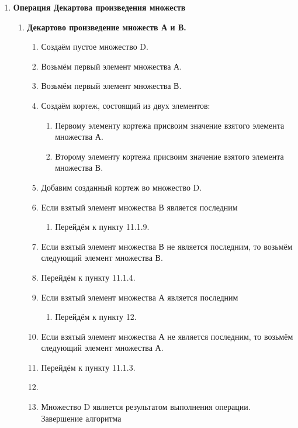 \documentclass[a4paper,12pt]{extarticle}
\begin{document}
\begin{enumerate}
\begin{enumerate}[label*=\arabic*.]
\begin{enumerate}[label*=\arabic*.]
\begin{enumerate}[label*=\arabic*.]
        \end{enumerate}
      \end{enumerate}
    \end{enumerate}
  \item \textbf{Операция Декартова произведения множеств}
  \begin{enumerate}[label*=\arabic*.]
    \item \textbf{Декартово произведение множеств А и В.}
    \begin{enumerate}[label*=\arabic*.]
      \item Создаём пустое множество D.
      \item Возьмём первый элемент множества А.
      \item Возьмём первый элемент множества В.
      \item Создаём кортеж, состоящий из двух элементов:
      \begin{enumerate}[label*=\arabic*.]
        \item Первому элементу кортежа присвоим значение взятого элемента множества А.
        \item Второму элементу кортежа присвоим значение взятого элемента множества В.
      \end{enumerate}
      \item Добавим созданный кортеж во множество D.
      \newpage
      \item Если взятый элемент множества В является последним
      \begin{enumerate}[label*=\arabic*.]
        \item Перейдём к пункту 11.1.9.
      \end{enumerate}
      \item Если взятый элемент множества В не является последним, то возьмём следующий элемент множества В.
      \item Перейдём к пункту 11.1.4.
      \item Если взятый элемент множества А является последним
      \begin{enumerate}[label*=\arabic*.]
        \item Перейдём к пункту 12.
      \end{enumerate}
      \item Если взятый элемент множества А не является последним, то возьмём следующий элемент множества А.
      \item Перейдём к пункту 11.1.3.
      \item \item Множество D является результатом выполнения операции. Завершение алгоритма

\end{enumerate}
\end{enumerate}
\end{enumerate}
\end{document}
